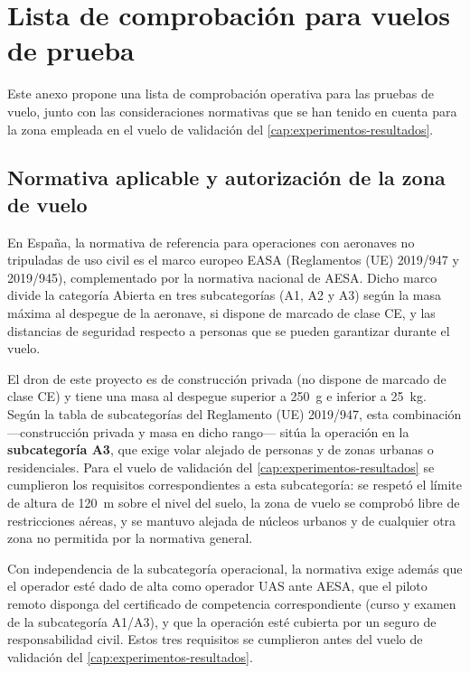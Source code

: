 
\chapter{Lista de comprobación para vuelos de prueba}
\label{cap:anexo-checklist}

Este anexo propone una lista de comprobación operativa para las pruebas de vuelo, junto con las consideraciones normativas que se han tenido en cuenta para la zona empleada en el vuelo de validación del \autoref{cap:experimentos-resultados}.

\section{Normativa aplicable y autorización de la zona de vuelo}
\label{sec:normativa-vuelo}

En España, la normativa de referencia para operaciones con aeronaves no tripuladas de uso civil es el marco europeo EASA (Reglamentos (UE) 2019/947 y 2019/945), complementado por la normativa nacional de AESA. Dicho marco divide la categoría Abierta en tres subcategorías (A1, A2 y A3) según la masa máxima al despegue de la aeronave, si dispone de marcado de clase CE, y las distancias de seguridad respecto a personas que se pueden garantizar durante el vuelo.

El dron de este proyecto es de construcción privada (no dispone de marcado de clase CE) y tiene una masa al despegue superior a \SI{250}{\gram} e inferior a \SI{25}{\kilo\gram}. Según la tabla de subcategorías del Reglamento (UE) 2019/947, esta combinación —construcción privada y masa en dicho rango— sitúa la operación en la \textbf{subcategoría A3}, que exige volar alejado de personas y de zonas urbanas o residenciales. Para el vuelo de validación del \autoref{cap:experimentos-resultados} se cumplieron los requisitos correspondientes a esta subcategoría: se respetó el límite de altura de \SI{120}{\metre} sobre el nivel del suelo, la zona de vuelo se comprobó libre de restricciones aéreas, y se mantuvo alejada de núcleos urbanos y de cualquier otra zona no permitida por la normativa general.

Con independencia de la subcategoría operacional, la normativa exige además que el operador esté dado de alta como operador UAS ante AESA, que el piloto remoto disponga del certificado de competencia correspondiente (curso y examen de la subcategoría A1/A3), y que la operación esté cubierta por un seguro de responsabilidad civil. Estos tres requisitos se cumplieron antes del vuelo de validación del \autoref{cap:experimentos-resultados}.

